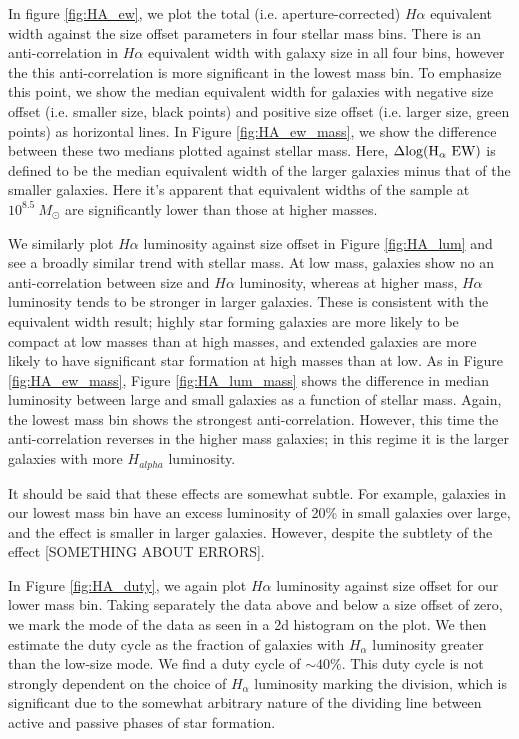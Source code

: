 \documentclass[iop]{emulateapj}
\begin{document}
In figure \ref{fig:HA_ew}, we plot the total (i.e. aperture-corrected) $H\alpha$ equivalent width against the size offset parameters in four stellar mass bins. There is an anti-correlation in $H \alpha$ equivalent width with galaxy size in all four bins, however the this anti-correlation is  more significant in the lowest mass bin. To emphasize this point, we show the median equivalent width for galaxies with negative size offset (i.e. smaller size, black points) and positive size offset (i.e. larger size, green points) as horizontal lines. In Figure \ref{fig:HA_ew_mass}, we show the difference between these two medians plotted against stellar mass. Here, $\rm \Delta log(H_{\alpha}\ EW)$ is defined to be the median equivalent width of the larger galaxies minus that of the smaller galaxies. Here it's apparent that equivalent widths of the sample at $10^{8.5} \ M_{\odot}$ are significantly lower than those at higher masses.

We similarly plot $H\alpha$ luminosity against size offset in Figure \ref{fig:HA_lum} and see a broadly similar trend with stellar mass. At low mass, galaxies show no an anti-correlation between size and $H\alpha$ luminosity, whereas at higher mass, $H\alpha$ luminosity tends to be stronger in larger galaxies. These is consistent with the equivalent width result; highly star forming galaxies are more likely to be compact at low masses than at high masses, and extended galaxies are more likely to have significant star formation at high masses than at low. As in Figure \ref{fig:HA_ew_mass}, Figure \ref{fig:HA_lum_mass} shows the difference in median luminosity between large and small galaxies as a function of stellar mass. Again, the lowest mass bin shows the strongest anti-correlation. However, this time the anti-correlation reverses in the higher mass galaxies; in this regime it is the larger galaxies with more $H_{alpha}$ luminosity.

It should be said that these effects are somewhat subtle. For example, galaxies in our lowest mass bin have an excess luminosity of 20\% in small galaxies over large, and the effect is smaller in larger galaxies. However, despite the subtlety of the effect [SOMETHING ABOUT ERRORS]. 

In Figure \ref{fig:HA_duty}, we again plot $H\alpha$ luminosity against size offset for our lower mass bin. Taking separately the data above and below a size offset of zero, we mark the mode of the data as seen in a 2d histogram on the plot. We then estimate the duty cycle as the fraction of galaxies with $H_{\alpha}$ luminosity greater than the low-size mode. We find a duty cycle of $\sim40\%$.  This duty cycle is not strongly dependent on the choice of $H_{\alpha}$ luminosity marking the division, which is significant due to the somewhat arbitrary nature of the dividing line between active and passive phases of star formation.
\end{document}
